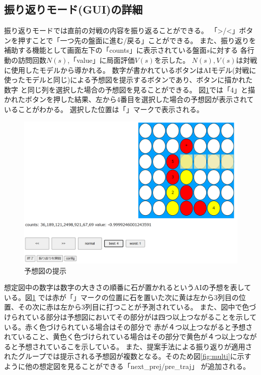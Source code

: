 \subsection{振り返りモード(GUI)の詳細}
振り返りモードでは直前の対戦の内容を振り返ることができる。
「>/<」ボタンを押すことで「一つ先の盤面に進む/戻る」ことができる。
また、振り返りを補助する機能として画面左下の「counts」に表示されている盤面$s$に対する
各行動の訪問回数$N(s)$,「value」に局面評価$V(s)$を示した。
$N(s),V(s)$は対戦に使用したモデルから導かれる。
数字が書かれているボタンはAIモデル(対戦に使ったモデルと同じ)による予想図を提示するボタンであり、ボタンに描かれた数字
と同じ列を選択した場合の予想図を見ることができる。
図\ref{fig:number-button}では「4」と描かれたボタンを押した結果、左から4番目を選択した場合の予想図が表示されていることがわかる。
選択した位置は「\*」マークで表示される。
\begin{figure}[t]
	\centering
	\includegraphics[width=\linewidth]{./figure/trajSystem.png}
	\caption{予想図の提示}
	\label{fig:number-button}
\end{figure}
想定図中の数字は数字の大きさの順番に石が置かれるというAIの予想を表している。図\ref{fig:number-button}
では赤が「\*」マークの位置に石を置いた次に黄は左から3列目の位置、その次に赤は左から3列目に打つことが予測されている。
また、図中で色づけられている部分は予想図においてその部分がは四つ以上つながることを示している。赤く色づけられている場合はその部分で
赤が４つ以上つながると予想されていること、黄色く色づけられている場合はその部分で黄色が４つ以上つながると予想されているこを示している。
また、提案手法による振り返りが適用されたグループでは提示される予想図が複数となる。そのため図\ref{fig:multi}に示すように他の想定図を見ることができる「next\_prej/pre\_traj」
が追加される。
